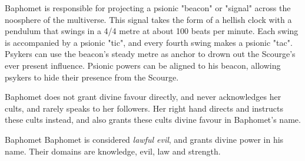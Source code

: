 
Baphomet is responsible for projecting a psionic "beacon" or "signal"
across the noosphere of the multiverse. This signal takes the form of a
hellish clock with a pendulum that swings in a 4/4 metre at about 100 beats
per minute. Each swing is accompanied by a psionic "tic", and every fourth
swing makes a psionic "tac". Psykers can use the beacon's steady metre as
anchor to drown out the Scourge's ever present influence. Psionic powers can
be aligned to his beacon, allowing psykers to hide their presence from
the Scourge.

Baphomet does not grant divine favour directly, and never acknowledges her
cults, and rarely speaks to her followers. Her right hand
 directs and instructs these cults instead, and also
grants these cults divine favour in Baphomet's name.

\begin{35e}{Baphomet}
  Baphomet is considered \emph{lawful evil}, and  grants
  divine power in his name. Their domains are knowledge, evil, law and
  strength.
\end{35e}
